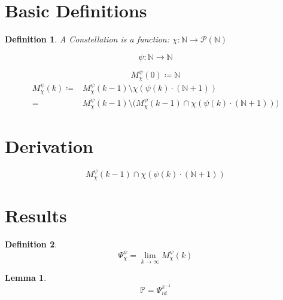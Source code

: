\documentclass{article}
\title{\titlevar}
\author{\authorvar}
\date{\datevar}
\newcommand{\inv}{^{-1}}
\newcommand{\powerset}{\mathcal{P}}
\newtheorem{definition}{Definition}
\newtheorem{lemma}{Lemma}
\begin{document}
	\maketitle
	
	\section{Basic Definitions}
	
	\begin{definition}
		A Constellation is a function: $χ: ℕ → \powerset(ℕ)$
	\end{definition}
	
	\begin{equation}
		ψ: ℕ → ℕ
	\end{equation}
	
	\begin{equation}
		M_χ^ψ(0) \coloneq ℕ
	\end{equation}
	\begin{equation}
		\begin{split}
			M_χ^ψ(k) \coloneq& M_χ^ψ(k-1) \setminus χ(ψ(k)·(ℕ+1)) \\
			=& M_χ^ψ(k-1) \setminus \Big( M_χ^ψ(k-1) \cap χ(ψ(k)·(ℕ+1)) \Big)
		\end{split}
	\end{equation}
	
	\section{Derivation}
	
	\begin{equation}
		M_χ^ψ(k-1) \cap χ(ψ(k)·(ℕ+1))
	\end{equation}
	
	\section{Results}
	
	\begin{definition}
		\begin{equation}
			Ψ_χ^ψ = \lim_{k→∞} M_χ^ψ(k)
		\end{equation}
	\end{definition}
	
	\begin{lemma}
		\begin{equation}
			\mathbb{P} = Ψ_{id}^{π\inv}
		\end{equation}
	\end{lemma}
\end{document}
